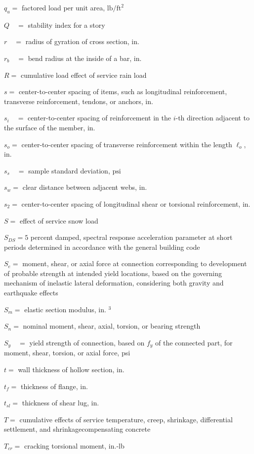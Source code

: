 \documentclass[10pt]{article}
\begin{document}
$q_{u}=$ factored load per unit area, $\mathrm{lb} / \mathrm{ft}^{2}$

$Q \quad=$ stability index for a story

$r \quad=$ radius of gyration of cross section, in.

$r_{b} \quad=$ bend radius at the inside of a bar, in.

$R=$ cumulative load effect of service rain load

$s=$ center-to-center spacing of items, such as longitudinal reinforcement, transverse reinforcement, tendons, or anchors, in.

$s_{i} \quad=$ center-to-center spacing of reinforcement in the $i$-th direction adjacent to the surface of the member, in.

$s_{o}=$ center-to-center spacing of transverse reinforcement within the length $\ell_{o}$, in.

$s_{s} \quad=$ sample standard deviation, $\mathrm{psi}$

$s_{w}=$ clear distance between adjacent webs, in.

$s_{2}=$ center-to-center spacing of longitudinal shear or torsional reinforcement, in.

$S=$ effect of service snow load

$S_{D S}=5$ percent damped, spectral response acceleration parameter at short periods determined in accordance with the general building code

$S_{e}=$ moment, shear, or axial force at connection corresponding to development of probable strength at intended yield locations, based on the governing mechanism of inelastic lateral deformation, considering both gravity and earthquake effects

$S_{m}=$ elastic section modulus, in. ${ }^{3}$

$S_{n}=$ nominal moment, shear, axial, torsion, or bearing strength

$S_{y} \quad=$ yield strength of connection, based on $f_{y}$ of the connected part, for moment, shear, torsion, or axial force, psi

$t=$ wall thickness of hollow section, in.

$t_{f}=$ thickness of flange, in.

$t_{s l}=$ thickness of shear lug, in.

$T=$ cumulative effects of service temperature, creep, shrinkage, differential settlement, and shrinkagecompensating concrete

$T_{c r}=$ cracking torsional moment, in.-lb
\end{document}
